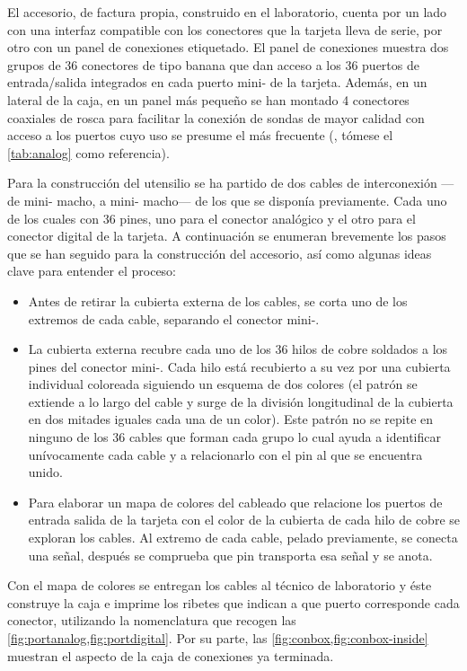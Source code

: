 El accesorio, de factura propia, construido en el laboratorio, cuenta por
un lado con una interfaz compatible con los conectores que la tarjeta lleva
de serie, por otro con un panel de conexiones etiquetado. El panel de
conexiones muestra dos grupos de 36 conectores de tipo banana que dan
acceso a los 36 puertos de entrada/salida integrados en cada puerto
mini- de la tarjeta. Además, en un lateral de la caja, en un panel
más pequeño se han montado 4 conectores coaxiales de rosca para facilitar
la conexión de sondas de mayor calidad con acceso a los puertos cuyo uso se
presume el más frecuente (, tómese el
\cref{tab:analog} como referencia).

Para la construcción del utensilio se ha partido de dos cables de
interconexión ---de mini- macho, a mini- macho--- de los que
se disponía previamente. Cada uno de los cuales con 36 pines, uno para el
conector analógico y el otro para el conector digital de la tarjeta. A
continuación se enumeran brevemente los pasos que se han seguido para la
construcción del accesorio, así como algunas ideas clave para entender el
proceso:

\begin{itemize}
	\item Antes de retirar la cubierta externa de los cables, se corta
		uno de los extremos de cada cable, separando el conector
		mini-.
	\item La cubierta externa recubre cada uno de los 36 hilos de cobre
		soldados a los pines del conector mini-. Cada hilo
		está recubierto a su vez por una cubierta individual
		coloreada siguiendo un esquema de dos colores (el patrón se
		extiende a lo largo del cable y surge de la división
		longitudinal de la cubierta en dos mitades iguales cada una
		de un color). Este patrón no se repite en ninguno de los 36
		cables que forman cada grupo lo cual ayuda a identificar
		unívocamente cada cable y a relacionarlo con el pin al que
		se encuentra unido.
	\item Para elaborar un mapa de colores del cableado que relacione
		los puertos de entrada salida de la tarjeta con el color de
		la cubierta de cada hilo de cobre se exploran los cables.
		Al extremo de cada cable, pelado previamente, se conecta
		una señal, después se comprueba que pin transporta esa
		señal y se anota.
\end{itemize}

Con el mapa de colores se entregan los cables al técnico de laboratorio y
éste construye la caja e imprime los ribetes que indican a que puerto
corresponde cada conector, utilizando la nomenclatura que recogen las
\vref{fig:portanalog,fig:portdigital}. Por su parte, las
\cref{fig:conbox,fig:conbox-inside} muestran el aspecto de la caja de
conexiones ya terminada.

